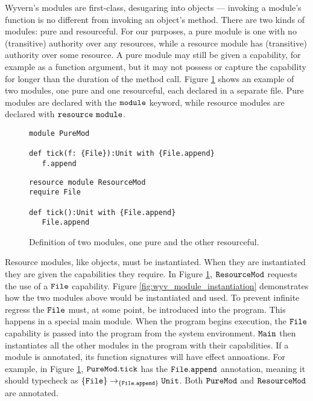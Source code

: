 Wyvern's modules are first-class, desugaring into objects --- invoking a module's function is no different from invoking an object's method. There are two kinds of modules: pure and resourceful. For our purposes, a pure module is one with no (transitive) authority over any resources, while a resource module has (transitive) authority over some resource. A pure module may still be given a capability, for example as a function argument, but it may not possess or capture the capability for longer than the duration of the method call. Figure \ref{fig:wyv_modules} shows an example of two modules, one pure and one resourceful, each declared in a separate file. Pure modules are declared with the $\mathtt{module}$ keyword, while resource modules are declared with $\mathtt{resource~module}$.

\begin{figure}[h]

\begin{lstlisting}
module PureMod

def tick(f: {File}):Unit with {File.append}
   f.append

\end{lstlisting}

\begin{lstlisting}
resource module ResourceMod
require File

def tick():Unit with {File.append}
   File.append
\end{lstlisting}

\caption{Definition of two modules, one pure and the other resourceful.}
\label{fig:wyv_modules}
\end{figure}

Resource modules, like objects, must be instantiated. When they are instantiated they are given the capabilities they require. In Figure \ref{fig:wyv_modules}, $\mathtt{ResourceMod}$ requests the use of a $\mathtt{File}$ capability. Figure \ref{fig:wyv_module_instantiation} demonstrates how the two modules above would be instantiated and used. To prevent infinite regress the $\mathtt{File}$ must, at some point, be introduced into the program. This happens in a special main module. When the program begins execution, the $\mathtt{File}$ capability is passed into the program from the system environment. $\mathtt{Main}$ then instantiates all the other modules in the program with their capabilities. If a module is annotated, its function signatures will have effect annoations. For example, in Figure \ref{fig:wyv_modules}, $\mathtt{PureMod.tick}$ has the $\mathtt{File.append}$ annotation, meaning it should typecheck as $\mathtt{ \{ File \} \rightarrow_{\{\mathtt{File.append}\}} \mathtt{Unit} }$. Both $\mathtt{PureMod}$ and $\mathtt{ResourceMod}$ are annotated. 


